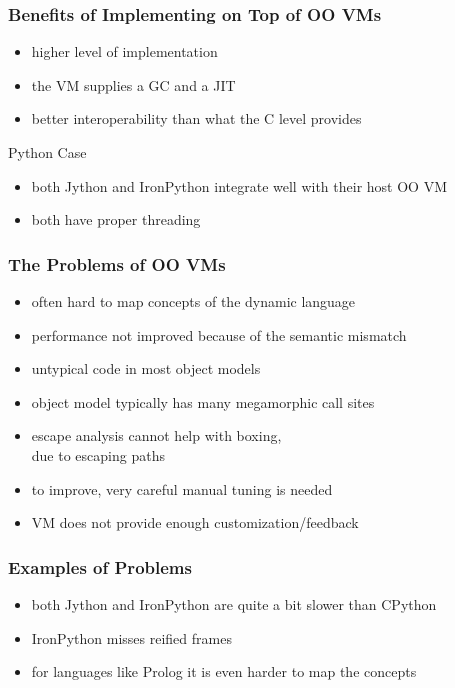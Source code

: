 \documentclass[utf8x]{beamer}
\begin{document}
\begin{frame}
  \frametitle{Benefits of Implementing on Top of OO VMs}
  \begin{itemize}
  \item higher level of implementation
  \item the VM supplies a GC and a JIT
  \item better interoperability than what the C level provides
  \end{itemize}
  \pause
  \begin{block}{
    Python Case}
    \begin{itemize}
    \item both Jython and IronPython integrate well with their host OO VM
    \item both have proper threading
    \end{itemize}
  \end{block}
\end{frame}

\begin{frame}
  \frametitle{The Problems of OO VMs}
  \begin{itemize}
      \item often hard to map concepts of the dynamic language
      \item performance not improved because of the semantic mismatch
      \item untypical code in most object models
      \item object model typically has many megamorphic call sites
      \pause
      \item escape analysis cannot help with boxing,\\
      due to escaping paths
      \item to improve, very careful manual tuning is needed
      \item VM does not provide enough customization/feedback
  \end{itemize}
\end{frame}

\begin{frame}
  \frametitle{Examples of Problems}
  \begin{itemize}
      \item both Jython and IronPython are quite a bit slower than CPython
      \item IronPython misses reified frames
      \pause
      \item for languages like Prolog it is even harder to map the concepts
  \end{itemize}
\end{frame}
\end{document}
